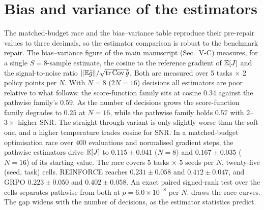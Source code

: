 \section{Bias and variance of the estimators}
\label{supp:e1}


The matched-budget race and the bias--variance table reproduce their pre-repair
values to three decimals, so the estimator comparison is robust to the benchmark
repair.
The bias--variance figure of the main manuscript (Sec.~V-C) measures, for a
single $S{=}8$-sample estimate, the cosine to the
reference gradient of $\mathbb{E}[J]$ and the signal-to-noise ratio
$\|\mathbb{E}\hat g\|/\sqrt{\operatorname{tr}\operatorname{Cov}\hat g}$.  Both are measured
over 5 tasks $\times$ 2 policy points per $N$.  With $N{=}8$ ($2N{=}16$) decisions all estimators are
poor relative to what follows: the score-function family sits at cosine $0.34$
against the pathwise family's $0.59$.  As the number of decisions grows the
score-function family degrades to $0.25$ at $N{=}16$, while the pathwise family holds
$0.57$ with $2$--$3\times$ higher SNR.  The straight-through
variant is only slightly worse than the soft one, and a higher temperature trades
cosine for SNR.  In a matched-budget optimisation race over 400 evaluations and normalised gradient
steps, the pathwise estimators drive
$\mathbb{E}[J]$ to $0.115\pm0.041$ ($N{=}8$) and $0.167\pm0.035$ ($N{=}16$) of its starting
value.  The race covers 5 tasks $\times$ 5 seeds per $N$, twenty-five (seed, task) cells.  REINFORCE reaches $0.231\pm0.058$ and
$0.412\pm0.047$, and GRPO $0.223\pm0.050$ and $0.402\pm0.058$.  An exact paired
signed-rank test over the cells separates pathwise from both at $p=6.0\times10^{-8}$
per $N$.   draws the race curves.  The gap widens with the number of
decisions, as the estimator statistics predict.
